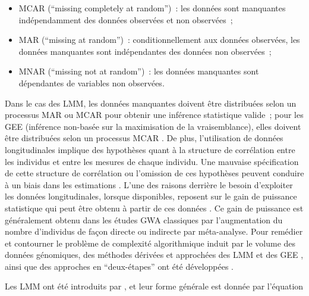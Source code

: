 \documentclass[11pt,a4paper,notrimn]{krantz}
\theoremstyle{definition}
\theoremstyle{definition}
\theoremstyle{remark}
\begin{document}
\begin{itemize}
\item
  MCAR (``missing completely at random'')~: les données sont manquantes
  indépendamment des données observées et non observées~;
\item
  MAR (``missing at random'')~: conditionnellement aux données
  observées, les données manquantes sont indépendantes des données non
  observées~;
\item
  MNAR (``missing not at random'')~: les données manquantes sont
  dépendantes de variables non observées.
\end{itemize}

Dans le cas des LMM, les données manquantes doivent être distribuées
selon un processus MAR ou MCAR pour obtenir une inférence statistique
valide~; pour les GEE (inférence non-basée sur la maximisation de la
vraisemblance), elles doivent être distribuées selon un processus MCAR
\citep{robins_estimation_1994}. De plus, l'utilisation de données
longitudinales implique des hypothèses quant à la structure de
corrélation entre les individus et entre les mesures de chaque individu.
Une mauvaise spécification de cette structure de corrélation ou
l'omission de ces hypothèses peuvent conduire à un biais dans les
estimations \citep{lu_impact_2009}. L'une des raisons derrière le besoin
d'exploiter les données longitudinales, lorsque disponibles, reposent
sur le gain de puissance statistique qui peut être obtenu à partir de
ces données
\citep{costanza_consistency_2012, hossain_analysis_2014, hu_association_2014, lee_analysis_2014, wang_comparing_2014, xu_longitudinal_2014, zhao_cross-sectional_2014}.
Ce gain de puissance est généralement obtenu dans les études GWA
classiques par l'augmentation du nombre d'individus de façon directe ou
indirecte par méta-analyse. Pour remédier et contourner le problème de
complexité algorithmique induit par le volume des données génomiques,
des méthodes dérivées et approchées des LMM
\citep{sikorska_fast_2013, verbeke_conditional_2001} et des GEE
\citep{robins_estimation_1994, sitlani_generalized_2015}, ainsi que des
approches en ``deux-étapes''
\citep{hossain_analysis_2014, houwing-duistermaat_gene_2014, musolf_mapping_2014, roslin_genome-wide_2009, sikorska_gwas_2015, sikorska_fast_2013, wang_comparing_2014}
ont été développées
\citep{beyene_longitudinal_2014, wu_mixed-effects_2014, kerner_use_2009}.

Les LMM ont été introduits par \citet{laird_random-effects_1982}, et
leur forme générale est donnée par l'équation
\end{document}
